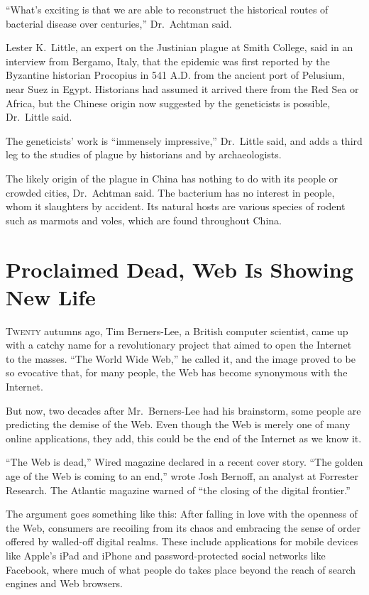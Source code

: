 ﻿\documentclass[12pt]{article}
\begin{document}
``What's exciting is that we are able to reconstruct the historical routes of bacterial disease over
centuries,'' Dr.~Achtman said.

Lester K.~Little, an expert on the Justinian plague at Smith College, said in an interview from
Bergamo, Italy, that the epidemic was first reported by the Byzantine historian Procopius in 541
A.D. from the ancient port of Pelusium, near Suez in Egypt. Historians had assumed it arrived there
from the Red Sea or Africa, but the Chinese origin now suggested by the geneticists is possible,
Dr.~Little said.

The geneticists' work is ``immensely impressive,'' Dr.~Little said, and adds a third leg to the
studies of plague by historians and by archaeologists.

The likely origin of the plague in China has nothing to do with its people or crowded cities,
Dr.~Achtman said. The bacterium has no interest in people, whom it slaughters by accident. Its
natural hosts are various species of rodent such as marmots and voles, which are found throughout
China.

\section{Proclaimed Dead, Web Is Showing New Life}

\lettrine{T}{wenty} autumns ago, Tim Berners-Lee, a British computer
scientist, came up with a catchy name for a revolutionary project that aimed to open the Internet to
the masses. ``The World Wide Web,'' he called it, and the image proved to be so evocative that, for
many people, the Web has become synonymous with the Internet.

But now, two decades after Mr.~Berners-Lee had his brainstorm, some people are predicting the demise
of the Web. Even though the Web is merely one of many online applications, they add, this could be
the end of the Internet as we know it.

``The Web is dead,'' Wired magazine declared in a recent cover story. ``The golden age of the Web is
coming to an end,'' wrote Josh Bernoff, an analyst at Forrester Research. The Atlantic magazine
warned of ``the closing of the digital frontier.''

The argument goes something like this: After falling in love with the openness of the Web, consumers
are recoiling from its chaos and embracing the sense of order offered by walled-off digital realms.
These include applications for mobile devices like Apple's iPad and iPhone and password-protected
social networks like Facebook, where much of what people do takes place beyond the reach of search
engines and Web browsers.
\end{document}
